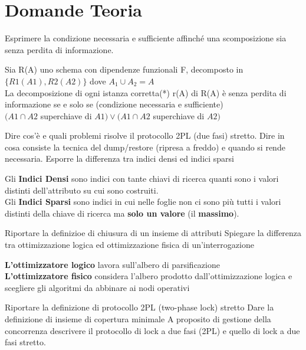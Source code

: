 \documentclass{exam}
\begin{document}
\printanswers

\section{Domande Teoria}

\begin{questions}
    \question Esprimere la condizione necessaria e sufficiente affinché una scomposizione sia senza perdita di informazione.
    \begin{solution}
    Sia R(A) uno schema con dipendenze funzionali F, decomposto in $\{R1(A1), R2(A2)\}$ dove $A_1 \cup A_2 = A$ \\
    La decomposizione di ogni istanza corretta(*) r(A) di  R(A) è senza perdita di informazione se e solo se  (condizione necessaria e sufficiente) \\  
    $(A1\cap A2$ superchiave di $A1)\vee(A1 \cap A2 $ superchiave di $A2) $
    \end{solution}
    \question Dire cos’è e quali problemi risolve il protocollo 2PL (due fasi) stretto.
    \question Dire in cosa consiste la tecnica del dump/restore (ripresa a freddo) e quando si rende necessaria.
    \question Esporre la differenza tra indici densi ed indici sparsi
    \begin{solution}
        Gli \textbf{Indici Densi} sono indici con tante chiavi di ricerca quanti sono i valori distinti dell'attributo su cui sono costruiti.\\
        Gli \textbf{Indici Sparsi} sono indici in cui nelle foglie non ci sono più tutti i valori distinti della chiave di ricerca ma \textbf{solo un valore} (il \textbf{massimo}).
    \end{solution}
    \question Riportare la definizioe di chiusura di un insieme di attributi
    \question Spiegare la differenza tra ottimizzazione logica ed ottimizzazione fisica di un'interrogazione
    \begin{solution}
        \textbf{L'ottimizzatore logico} lavora sull'albero di parsificazione\\
        \textbf{L'ottimizzatore fisico} considera l'albero prodotto dall'ottimizzazione logica e scegliere gli algoritmi da abbinare ai nodi operativi
    \end{solution}
    \question Riportare la definizione di protocollo 2PL (two-phase lock) stretto
    \question Dare la definizione di insieme di copertura minimale
    \question A proposito di gestione della concorrenza descrivere il protocollo di lock a due fasi (2PL) e quello di lock a due fasi stretto.

\end{questions}
\end{document}
